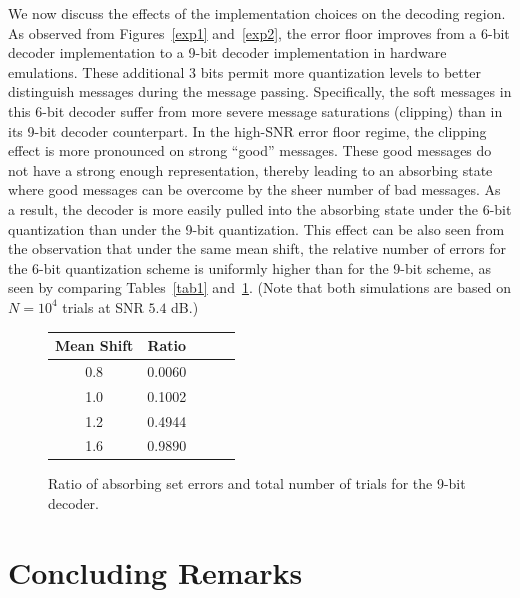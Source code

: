 We now discuss the effects of the implementation choices on the
decoding region. As observed from Figures~\ref{exp1} and~\ref{exp2},
the error floor improves from a 6-bit decoder implementation to a
9-bit decoder implementation in hardware emulations. These additional
3 bits permit more quantization levels to better distinguish messages
during the message passing. Specifically, the soft messages in this
6-bit decoder suffer from more severe message saturations (clipping)
than in its 9-bit decoder counterpart. In the high-SNR error floor
regime, the clipping effect is more pronounced on strong ``good''
messages. These good messages do not have a strong enough
representation, thereby leading to an absorbing state where good
messages can be overcome by the sheer number of bad messages. As a
result, the decoder is more easily pulled into the absorbing state
under the 6-bit quantization than under the 9-bit quantization. This
effect can be also seen from the observation that under the same mean
shift, the relative number of errors for the 6-bit quantization scheme
is uniformly higher than for the 9-bit scheme, as seen by comparing
Tables~\ref{tab1} and~\ref{tab4}. (Note that both simulations are
based on $N = 10^4$ trials at SNR $5.4$ dB.)

\begin{figure}\center\begin{tabular}{|c|c|c|c|c|}
  \hline
  Mean Shift & Ratio  \\
  \hline
  0.8 &   0.0060\\
  1.0 &   0.1002\\
  1.2 &   0.4944\\
  1.6 &   0.9890\\
  \hline
\end{tabular}
\caption{Ratio of absorbing set errors and total number of trials
for the 9-bit decoder.}\label{tab4}
\end{figure}
\section{Concluding Remarks}\label{conc}

